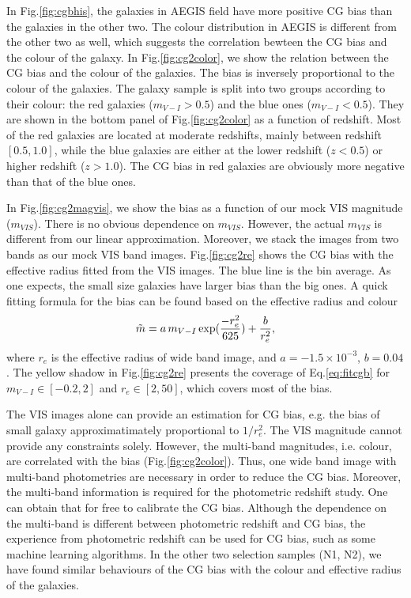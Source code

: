 \documentclass[useAMS,usenatbib]{mn2e}
\newcommand{\be}{\begin{equation}}
\newcommand{\ee}{\end{equation}}
\def\elabel#1{\label{eq:#1}}
\begin{document}
In Fig.\ref{fig:cgbhis}, the galaxies in AEGIS field have more
positive CG bias than the galaxies in the other two. The colour
distribution in AEGIS is different from the other two as well, which
suggests the correlation bewteen the CG bias and the colour of the
galaxy. In Fig.\ref{fig:cg2color}, we show the relation between the
CG bias and the colour of the galaxies. The bias is inversely
proportional to the colour of the galaxies. The galaxy sample is split
into two groups according to their colour: the red galaxies
($m_{V-I}>0.5$) and the blue ones ($m_{V-I}<0.5$). They are shown
in the bottom panel of Fig.\ref{fig:cg2color} as a function of
redshift. Most of the red galaxies are located at moderate redshifts,
mainly between redshift $[0.5,1.0]$, while the blue galaxies are
either at the lower redshift ($z<0.5$) or higher redshift
($z>1.0$). The CG bias in red galaxies are obviously more negative
than that of the blue ones.

In Fig.\ref{fig:cg2magvis}, we show the bias as a function of our mock VIS
magnitude ($m_{VIS}$). There is no obvious dependence on $m_{VIS}$. However,
the actual $m_{VIS}$ is different from our linear approximation. 
Moreover, we stack the images from two bands as our mock VIS band images.
Fig.\ref{fig:cg2re} shows the CG bias with the effective radius fitted
from the VIS images. The blue line is the bin average. As one
expects, the small size galaxies have larger bias than the big
ones. A quick fitting formula for the bias can be found based on the
effective radius and colour
%
\be
\tilde{m} = a\, m_{V-I}\,{\rm exp}({-r_e^2 \over 625}) +{b \over r_e^2},
\elabel{fitcgb}
\ee
%
where $r_e$ is the effective radius of wide band image, and
$a=-1.5\times 10^{-3}$, $b=0.04$. The yellow shadow in
Fig.\ref{fig:cg2re} presents the coverage of Eq.\ref{eq:fitcgb} for
$m_{V-I}\in [-0.2,2]$ and $r_e\in [2,50]$, which covers most of the
bias.

The VIS images alone can provide an estimation for CG bias, e.g. the
bias of small galaxy approximatimately proportional to $1/r_e^2$. The
VIS magnitude cannot provide any constraints solely. However, the multi-band
magnitudes, i.e. colour, are correlated with the bias
(Fig.\ref{fig:cg2color}). Thus, one wide band image with multi-band
photometries are necessary in order to reduce the CG bias. Moreover, the
multi-band information is required for the photometric redshift
study. One can obtain that for free to calibrate the CG bias. Although
the dependence on the multi-band is different between photometric
redshift and CG bias, the experience from photometric redshift can be
used for CG bias, such as some machine learning algorithms. In the other two
selection samples (N1, N2), we have found similar behaviours of the CG bias
with the colour and effective radius of the galaxies.
\end{document}
